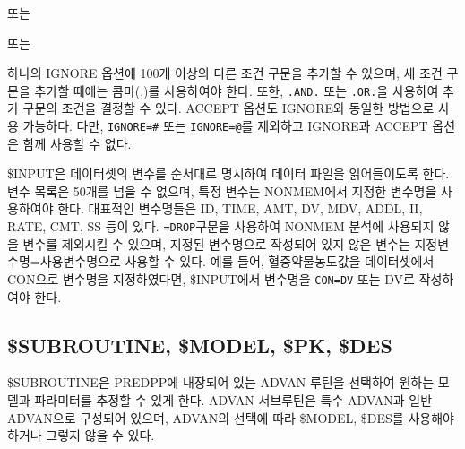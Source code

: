\documentclass[
  10pt,
  krantz2,
  a4paper]{krantz}
\newenvironment{Shaded}{\begin{snugshade}}{\end{snugshade}}
\newcommand{\CommentTok}[1]{\textcolor[rgb]{0.56,0.35,0.01}{\textit{#1}}}
\newcommand{\NormalTok}[1]{#1}
\newcommand{\OperatorTok}[1]{\textcolor[rgb]{0.81,0.36,0.00}{\textbf{#1}}}
\newcommand{\StringTok}[1]{\textcolor[rgb]{0.31,0.60,0.02}{#1}}
\newenvironment{Shaded}{\begin{snugshade}}{\end{snugshade}}
\theoremstyle{definition}
\theoremstyle{definition}
\theoremstyle{definition}
\theoremstyle{remark}
\begin{document}
\begin{Shaded}
\end{Shaded}

또는

\begin{Shaded}
\end{Shaded}

또는

\begin{Shaded}
\end{Shaded}

하나의 IGNORE 옵션에 100개 이상의 다른 조건 구문을 추가할 수 있으며, 새 조건 구문을 추가할 때에는 콤마(,)를 사용하여야 한다. 또한, \texttt{.AND.} 또는 \texttt{.OR.}을 사용하여 추가 구문의 조건을 결정할 수 있다. ACCEPT 옵션도 IGNORE와 동일한 방법으로 사용 가능하다. 다만, \texttt{IGNORE=\#} 또는 \texttt{IGNORE=@}를 제외하고 IGNORE과 ACCEPT 옵션은 함께 사용할 수 없다.

\$INPUT은 데이터셋의 변수를 순서대로 명시하여 데이터 파일을 읽어들이도록 한다. 변수 목록은 50개를 넘을 수 없으며, 특정 변수는 NONMEM에서 지정한 변수명을 사용하여야 한다. 대표적인 변수명들은 ID, TIME, AMT, DV, MDV, ADDL, II, RATE, CMT, SS 등이 있다. \texttt{=DROP}구문을 사용하여 NONMEM 분석에 사용되지 않을 변수를 제외시킬 수 있으며, 지정된 변수명으로 작성되어 있지 않은 변수는 지정변수명=사용변수명으로 사용할 수 있다. 예를 들어, 혈중약물농도값을 데이터셋에서 CON으로 변수명을 지정하였다면, \$INPUT에서 변수명을 \texttt{CON=DV} 또는 DV로
작성하여야 한다.

\hypertarget{subroutine-model-pk-des}{%
\subsection{\$SUBROUTINE, \$MODEL, \$PK, \$DES}\label{subroutine-model-pk-des}}

\$SUBROUTINE은 PREDPP에 내장되어 있는 ADVAN 루틴을 선택하여 원하는 모델과 파라미터를 추정할 수 있게 한다. ADVAN 서브루틴은 특수 ADVAN과 일반 ADVAN으로 구성되어 있으며, ADVAN의 선택에 따라 \$MODEL, \$DES를 사용해야 하거나 그렇지 않을 수 있다.
\end{document}
